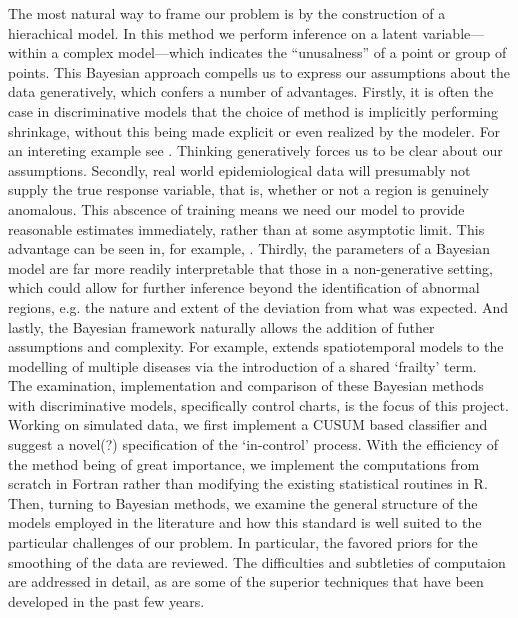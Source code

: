 \documentclass{report}
\begin{document}
The most natural way to frame our problem is by the construction of a hierachical model. In this method we perform inference on a latent variable---within a complex model---which indicates the ``unusalness'' of a point or group of points. This Bayesian approach compells us to express our assumptions about the data generatively, which confers a number of advantages. Firstly, it is often the case in discriminative models that the choice of method is implicitly performing shrinkage, without this being made explicit or even realized by the modeler. For an intereting example see \cite{stoch}. Thinking generatively forces us to be clear about our assumptions. Secondly, real world epidemiological data will presumably not supply the true response variable, that is, whether or not a region is genuinely anomalous. This abscence of training means we need our model to provide reasonable estimates immediately, rather than at some asymptotic limit. This advantage can be seen in, for example, \cite{ng}. Thirdly, the parameters of a Bayesian model are far more readily interpretable that those in a non-generative setting, which could allow for further inference beyond the identification of abnormal regions, e.g. the nature and extent of the deviation from what was expected. And lastly,
 the Bayesian framework naturally allows the addition of futher assumptions and complexity. For example, \cite{banerjee} extends spatiotemporal models to the modelling of multiple diseases via the introduction of a shared `frailty' term. \\

The examination, implementation and comparison of these Bayesian methods with discriminative models, specifically control charts, is the focus of this project. \\

Working on simulated data, we first implement a CUSUM based classifier and suggest a novel(?) specification of the `in-control' process. With the efficiency of the method being of great importance, we implement the computations from scratch in Fortran rather than modifying the existing statistical routines in R. \\

Then, turning to Bayesian methods, we examine the general structure of the models employed in the literature and how this standard is well suited to the particular challenges of our problem. In particular, the favored priors for the smoothing of the data are reviewed. The difficulties and subtleties of computaion are addressed in detail, as are some of the superior techniques that have been developed in the past few years. \\
\end{document}
